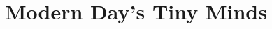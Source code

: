 \documentclass[../main]{subfiles}
\begin{document}
\chapter{Modern Day's Tiny Minds} \label{chp:}




\end{document}
